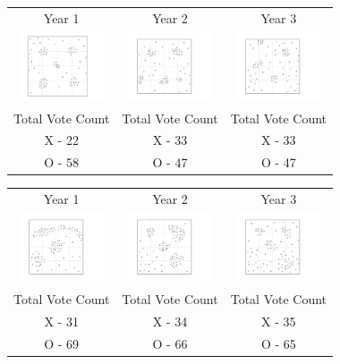 \begin{tabular}{c c c }

Year 1 & Year 2 & Year 3 \\
 \includegraphics[width=1in]{assets/Gerrymandering/Gerry4x4-80-1.pdf} &  \includegraphics[width=1in]{assets/Gerrymandering/Gerry4x4-80-2.pdf} &  \includegraphics[width=1in]{assets/Gerrymandering/Gerry4x4-80-3.pdf}\\
 Total Vote Count &  Total Vote Count &  Total Vote Count\\
 X -  22& X - 33 & X  - 33\\
 O - 58 & O - 47 & O - 47
 \end{tabular}
\begin{tabular}{c c c }

Year 1 & Year 2 & Year 3 \\
 \includegraphics[width=1in]{assets/Gerrymandering/Gerry4x4-100-1.pdf} &  \includegraphics[width=1in]{assets/Gerrymandering/Gerry4x4-100-2.pdf} &  \includegraphics[width=1in]{assets/Gerrymandering/Gerry4x4-100-3.pdf}\\
 Total Vote Count &  Total Vote Count &  Total Vote Count\\
 X -  31& X - 34 & X  - 35\\
 O - 69 & O - 66 & O - 65
 \end{tabular}


